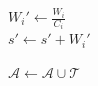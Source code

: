 \begin{algorithm}
{{{        }

        $ W_i' \leftarrow \frac{W_i}{C_i} $ \\
        $ s' \leftarrow s' + W_i'$
        
    }


     $ \mathcal{A} \leftarrow \mathcal{A} \cup \mathcal{T} $ \\
    
}
\caption{QT-WEAVER}\label{qtweaver-algo}
\end{algorithm}

\DecMargin{1em}
\ULforem %
